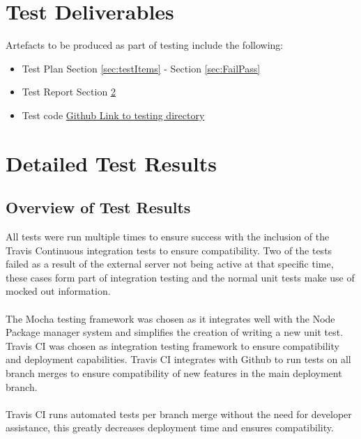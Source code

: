 \documentclass{article}
\begin{document}
\section{Test Deliverables}
Artefacts to be produced as part of testing include the following:
\begin{itemize}
\item Test Plan Section \ref{sec:testItems} - Section \ref{sec:FailPass}
\item Test Report Section \ref{sec:testReport}
\item Test code \href{https://github.com/QuintonWeenink/ValknutSolutions/tree/develop/test}{Github Link to testing directory}
\end{itemize}
\clearpage
\section{Detailed Test Results}\label{sec:testReport}
\subsection{Overview of Test Results}
All tests were run multiple times to ensure success with the inclusion of the Travis Continuous integration tests to ensure compatibility. Two of the tests failed as a result of the external server not being active at that specific time, these cases form part of integration testing and the normal unit tests make use of mocked out information.\\ \\
The Mocha testing framework was chosen as it integrates well with the Node Package manager system and 
simplifies the creation of writing a new unit test.\\
Travis CI was chosen as integration testing framework to ensure compatibility and deployment capabilities. Travis CI integrates with Github to run tests on all branch merges to ensure compatibility of new features in the main deployment branch.\\ \\
Travis CI runs automated tests per branch merge without the need for developer assistance, this greatly decreases deployment time and ensures compatibility.
\end{document}
